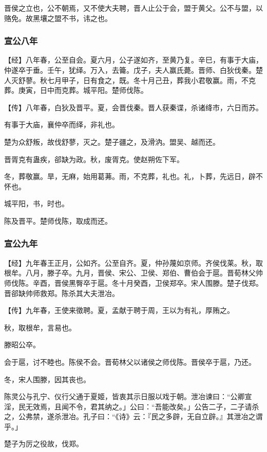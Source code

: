 \documentclass[]{article}
\begin{document}
晋侯之立也，公不朝焉，又不使大夫聘，晋人止公于会，盟于黄父。公不与盟，以赂免。故黑壤之盟不书，讳之也。

\hypertarget{header-n1373}{%
\subsubsection{宣公八年}\label{header-n1373}}

【经】八年春，公至自会。夏六月，公子遂如齐，至黄乃复。辛巳，有事于大庙，仲遂卒于垂。壬午，犹绎。万入，去籥。戊子，夫人赢氏薨。晋师、白狄伐秦。楚人灭舒蓼。秋七月甲子，日有食之，既。冬十月己丑，葬我小君敬赢。雨，不克葬。庚寅，日中而克葬。城平阳。楚师伐陈。

【传】八年春，白狄及晋平。夏，会晋伐秦。晋人获秦谍，杀诸绛市，六日而苏。

有事于大庙，襄仲卒而绎，非礼也。

楚为众舒叛，故伐舒蓼，灭之。楚子疆之，及滑汭。盟吴、越而还。

晋胥克有蛊疾，郤缺为政。秋，废胥克。使赵朔佐下军。

冬，葬敬赢。旱，无麻，始用葛茀。雨，不克葬，礼也。礼，卜葬，先远日，辟不怀也。

城平阳，书，时也。

陈及晋平。楚师伐陈，取成而还。

\hypertarget{header-n1384}{%
\subsubsection{宣公九年}\label{header-n1384}}

【经】九年春王正月，公如齐。公至自齐。夏，仲孙蔑如京师。齐侯伐莱。秋，取根牟。八月，滕子卒。九月，晋侯、宋公、卫侯、郑伯、曹伯会于扈。晋荀林父帅师伐陈。辛酉，晋侯黑臀卒于扈。冬十月癸酉，卫侯郑卒。宋人围滕。楚子伐郑。晋郤缺帅师救郑。陈杀其大夫泄冶。

【传】九年春，王使来徵聘。夏，孟献于聘于周，王以为有礼，厚贿之。

秋，取根牟，言易也。

滕昭公卒。

会于扈，讨不睦也。陈侯不会。晋荀林父以诸侯之师伐陈。晋侯卒于扈，乃还。

冬，宋人围滕，因其丧也。

陈灵公与孔宁、仪行父通于夏姬，皆衷其示日服以戏于朝。泄冶谏曰：``公卿宣淫，民无效焉，且闻不令，君其纳之。」公曰：``吾能改矣。」公告二子，二子请杀之，公弗禁，遂杀泄冶。孔子曰：``《诗》云：『民之多辟，无自立辟。』其泄冶之谓乎。」

楚子为厉之役故，伐郑。
\end{document}
